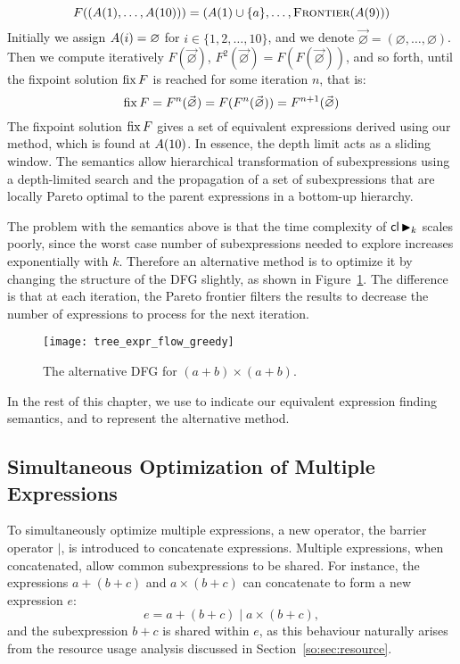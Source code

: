 \begin{equation}
      F((A({1}), \ldots, A({10})))
    = (A({1}) \cup \{a\}, \ldots, \operatorname{\textsc{Frontier}}(A({9})))
    \label{so:eq:transfer_function}
\end{equation}
Initially we assign $A({i}) = \varnothing$ for $i\in\{1,2,\ldots,10\}$,
and we denote $\vec\varnothing = (\varnothing, \ldots, \varnothing)$.
Then we compute iteratively $F(\vec\varnothing)$, $F^2(\vec\varnothing) =
F(F(\vec\varnothing))$, and so forth, until the fixpoint solution $\operatorname{\mathrm{fix}} F$ is
reached for some iteration $n$, that is:
\begin{equation}
    \operatorname{\mathrm{fix}} F = F^n(\vec\varnothing) =
    F(F^n(\vec\varnothing)) = F^{n + 1}(\vec\varnothing)
\end{equation}
The fixpoint solution $\operatorname{\mathrm{fix}} F$ gives a set of equivalent expressions derived
using our method, which is found at $A({10})$. In essence, the depth limit
acts as a sliding window.  The semantics allow hierarchical transformation of
subexpressions using a depth-limited search and the propagation of a set of
subexpressions that are locally Pareto optimal to the parent expressions in a
bottom-up hierarchy.

The problem with the semantics above is that the time complexity of $\mathsf{cl}
\operatorname{\blacktriangleright}_k$ scales poorly, since the worst case number of subexpressions needed
to explore increases exponentially with $k$. Therefore an alternative method
is to optimize it by changing the structure of the DFG slightly, as shown in
Figure~\ref{so:fig:tree_expr_flow_greedy}. The difference is that at each
iteration, the Pareto frontier filters the results to decrease the number of
expressions to process for the next iteration.
\begin{figure}[ht]
    \centering
    \texttt{[image: tree\_expr\_flow\_greedy]}
    \caption{The alternative DFG for $(a + b) \times (a + b)$.
    }\label{so:fig:tree_expr_flow_greedy}
\end{figure}

In the rest of this chapter, we use \frontiertrace{} to indicate our equivalent
expression finding semantics, and \greedytrace{} to represent the alternative
method.


\subsection{Simultaneous Optimization of Multiple Expressions}

To simultaneously optimize multiple expressions, a new operator, the barrier
operator $\mid$, is introduced to concatenate expressions.  Multiple
expressions, when concatenated, allow common subexpressions to be shared.  For
instance, the expressions $a + (b + c)$ and $a \times (b + c)$ can concatenate
to form a new expression $e$:
\begin{equation}
    e = a + (b + c) \mid a \times (b + c),
\end{equation}
and the subexpression $b + c$ is shared within $e$, as this behaviour
naturally arises from the resource usage analysis discussed in
Section~\ref{so:sec:resource}.

